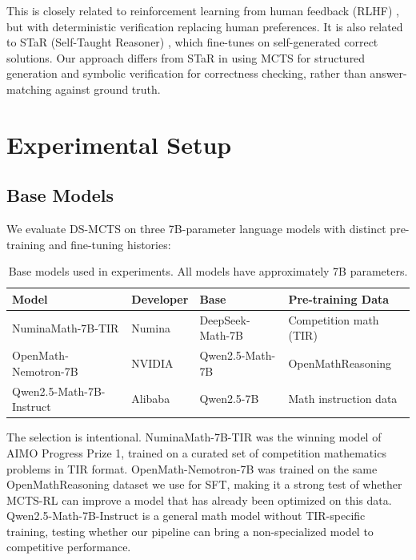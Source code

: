 \documentclass[11pt,a4paper]{article}
\begin{document}
This is closely related to reinforcement learning from human feedback (RLHF)
\citep{ouyang2022training}, but with deterministic verification replacing
human preferences. It is also related to STaR (Self-Taught Reasoner)
\citep{zelikman2022star}, which fine-tunes on self-generated correct solutions.
Our approach differs from STaR in using MCTS for structured generation and
symbolic verification for correctness checking, rather than answer-matching
against ground truth.


\section{Experimental Setup}
\label{sec:setup}

\subsection{Base Models}

We evaluate DS-MCTS on three 7B-parameter language models with distinct
pre-training and fine-tuning histories:

\begin{table}[h]
\centering
\caption{Base models used in experiments. All models have approximately 7B parameters.}
\label{tab:models}
\begin{tabular}{llll}
\toprule
\textbf{Model} & \textbf{Developer} & \textbf{Base} & \textbf{Pre-training Data} \\
\midrule
NuminaMath-7B-TIR & Numina & DeepSeek-Math-7B & Competition math (TIR) \\
OpenMath-Nemotron-7B & NVIDIA & Qwen2.5-Math-7B & OpenMathReasoning \\
Qwen2.5-Math-7B-Instruct & Alibaba & Qwen2.5-7B & Math instruction data \\
\bottomrule
\end{tabular}
\end{table}

The selection is intentional. NuminaMath-7B-TIR was the winning model of AIMO
Progress Prize 1, trained on a curated set of competition mathematics problems
in TIR format. OpenMath-Nemotron-7B was trained on the same OpenMathReasoning
dataset we use for SFT, making it a strong test of whether MCTS-RL can improve
a model that has already been optimized on this data. Qwen2.5-Math-7B-Instruct
is a general math model without TIR-specific training, testing whether our
pipeline can bring a non-specialized model to competitive performance.
\end{document}
